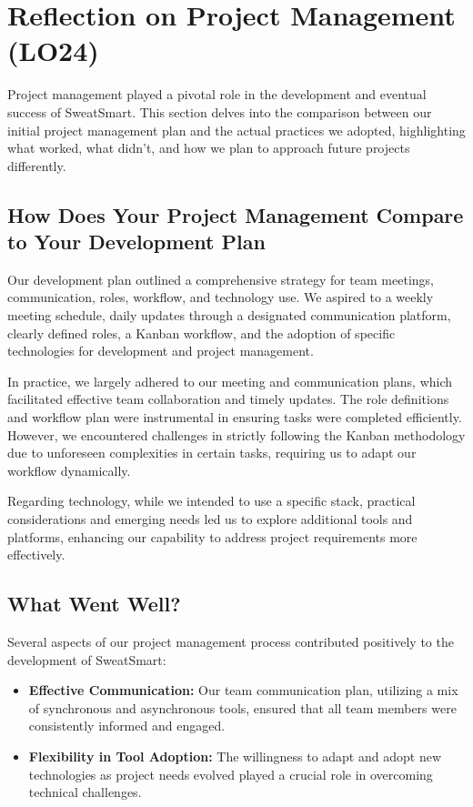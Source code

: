 \documentclass{article}
\begin{document}
\section{Reflection on Project Management (LO24)}

Project management played a pivotal role in the development and eventual success of SweatSmart. This section delves into the comparison between our initial project management plan and the actual practices we adopted, highlighting what worked, what didn't, and how we plan to approach future projects differently.

\subsection{How Does Your Project Management Compare to Your Development Plan}

Our development plan outlined a comprehensive strategy for team meetings, communication, roles, workflow, and technology use. We aspired to a weekly meeting schedule, daily updates through a designated communication platform, clearly defined roles, a Kanban workflow, and the adoption of specific technologies for development and project management.

In practice, we largely adhered to our meeting and communication plans, which facilitated effective team collaboration and timely updates. The role definitions and workflow plan were instrumental in ensuring tasks were completed efficiently. However, we encountered challenges in strictly following the Kanban methodology due to unforeseen complexities in certain tasks, requiring us to adapt our workflow dynamically.

Regarding technology, while we intended to use a specific stack, practical considerations and emerging needs led us to explore additional tools and platforms, enhancing our capability to address project requirements more effectively.

\subsection{What Went Well?}

Several aspects of our project management process contributed positively to the development of SweatSmart:

\begin{itemize}
    \item \textbf{Effective Communication:} Our team communication plan, utilizing a mix of synchronous and asynchronous tools, ensured that all team members were consistently informed and engaged.
    \item \textbf{Flexibility in Tool Adoption:} The willingness to adapt and adopt new technologies as project needs evolved played a crucial role in overcoming technical challenges.
\end{itemize}
\end{document}
